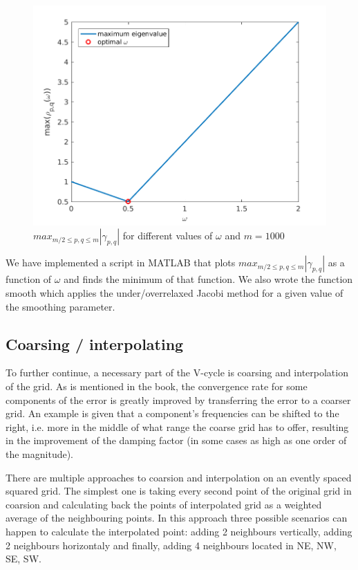 \documentclass[main.tex]{subfiles}
\begin{document}
\begin{figure}[h]
    \centering
    \includegraphics[width=\textwidth]{../Figures/omegaopt}
    \caption{$max_{m/2 \leq p,q \leq m} |\gamma_{p,q}|$ for different values of $\omega$ and $m = 1000$}
    \label{fig:omegaopt}
\end{figure}

We have implemented a script in MATLAB that plots $max_{m/2 \leq p,q \leq m} |\gamma_{p,q}|$ as a function of $\omega$ and finds the minimum of that function. We also wrote the function smooth which applies the under/overrelaxed Jacobi method for a given value of the smoothing parameter.

\subsection{Coarsing / interpolating}
To further continue, a necessary part of the V-cycle is coarsing and interpolation of the grid. As is mentioned in the book, the convergence rate for some components of the error is greatly improved by transferring the error to a coarser grid. An example is given that a component's frequencies can be shifted to the right, i.e. more in the middle of what range the coarse grid has to offer, resulting in the improvement of the damping factor (in some cases as high as one order of the magnitude).

There are multiple approaches to coarsion and interpolation on an evently spaced squared grid. The simplest one is taking every second point of the original grid in coarsion and calculating back the points of interpolated grid as a weighted average of the neighbouring points. In this approach three possible scenarios can happen to calculate the interpolated point: adding 2 neighbours vertically, adding 2 neighbours horizontaly and finally, adding 4 neighbours located in NE, NW, SE, SW.
\end{document}
